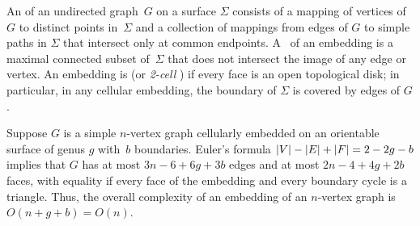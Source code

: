 \documentclass{sig-alternate}
\def\note#1{\EMPH{\color{red} #1}}
\def\fence#1#2{#1\mathord\shortuparrow#2}
\def\lsh{\operatorname{left}}
\def\rsh{\operatorname{right}}
\def\rev{\operatorname{rev}}
\def\lsh{\emph{left}}
\def\rsh{\emph{right}}
\def\rev{\emph{rev}}
\begin{document}
An  of an undirected graph~$G$ on a surface $\Sigma$ consists of a mapping of vertices of $G$ to distinct points in~$\Sigma$ and a collection of mappings from edges of $G$ to simple paths in $\Sigma$ that intersect only at common endpoints.  A~ of an embedding is a maximal connected subset of~$\Sigma$ that does not intersect the image of any edge or vertex.  An embedding is  (or \emph{2-cell} \cite{mt-gos-01}) if every face is an open topological disk; in particular, in any cellular embedding, the boundary of $\Sigma$ is covered by edges of $G$.


Suppose $G$ is a simple $n$-vertex graph cellularly embedded on an orientable surface of genus $g$ with~$b$ boundaries.  Euler's formula $\mathopen| V \mathclose|-\mathopen| E \mathclose|+\mathopen| F \mathclose| = 2-2g-b$ implies that $G$ has at most $3n-6+6g+3b$ edges and at most $2n-4+4g+2b$ faces, with equality if every face of the embedding and every boundary cycle is a triangle.  Thus, the overall complexity of an embedding of an $n$-vertex graph is $O(n+g+b) = O(n)$.


\end{document}

